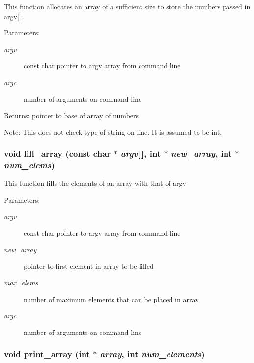 This function allocates an array of a sufficient size to store the numbers passed in argv[]. \begin{Desc}
\item[Parameters:]
\begin{description}
\item[{\em argv}]const char pointer to argv array from command line \item[{\em argc}]number of arguments on command line \end{description}
\end{Desc}
\begin{Desc}
\item[Returns:]pointer to base of array of numbers \end{Desc}
\begin{Desc}
\item[Note:]This does not check type of string on line. It is assumed to be int. \end{Desc}
\subsubsection{\setlength{\rightskip}{0pt plus 5cm}void fill\_\-array (const char $\ast$ {\em argv}[$\,$], int $\ast$ {\em new\_\-array}, int $\ast$ {\em num\_\-elems})}\label{sort_8h_710b7ff37ab6f6ab4ccce28c0f6b8c48}


This function fills the elements of an array with that of argv \begin{Desc}
\item[Parameters:]
\begin{description}
\item[{\em argv}]const char pointer to argv array from command line \item[{\em new\_\-array}]pointer to first element in array to be filled \item[{\em max\_\-elems}]number of maximum elements that can be placed in array \item[{\em argc}]number of arguments on command line \end{description}
\end{Desc}
\subsubsection{\setlength{\rightskip}{0pt plus 5cm}void print\_\-array (int $\ast$ {\em array}, int {\em num\_\-elements})}\label{sort_8h_8d05914dfc431857377538709fc5d8a2}


